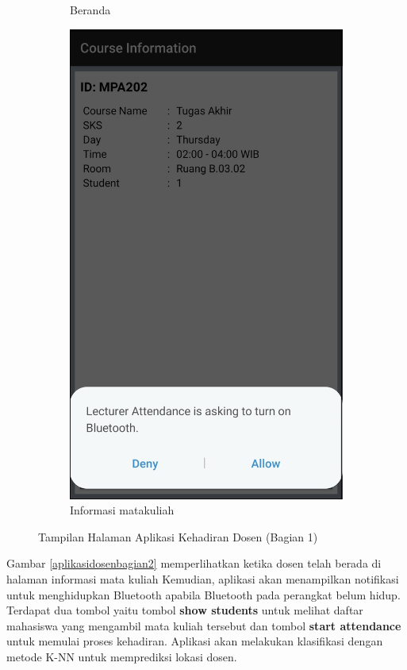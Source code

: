 \begin{enumerate}[a.]
\begin{figure} [H]
\begin{subfigure}{.5\textwidth}
			      \caption{Beranda}
		      \end{subfigure}
		      \begin{subfigure}{.5\textwidth}
			      \centering
			      \includegraphics[width=.5\linewidth]{gambar/android/dosen-4}
			      \caption{Informasi matakuliah}
		      \end{subfigure}
		      \vspace{0.5cm}
		      \caption{Tampilan Halaman Aplikasi Kehadiran Dosen (Bagian 1)}
		      \label{aplikasidosenbagian1}
	      \end{figure}

	      \vspace{0.5cm}
	      \par Gambar \ref{aplikasidosenbagian2} memperlihatkan ketika dosen telah berada di halaman informasi mata kuliah Kemudian, aplikasi akan menampilkan notifikasi untuk menghidupkan Bluetooth apabila Bluetooth pada perangkat belum hidup. Terdapat dua tombol yaitu tombol \textbf{show students} untuk melihat daftar mahasiswa yang mengambil mata kuliah tersebut dan tombol \textbf{start attendance} untuk memulai proses kehadiran. Aplikasi akan melakukan klasifikasi dengan metode K-NN untuk memprediksi lokasi dosen.


\end{enumerate}
